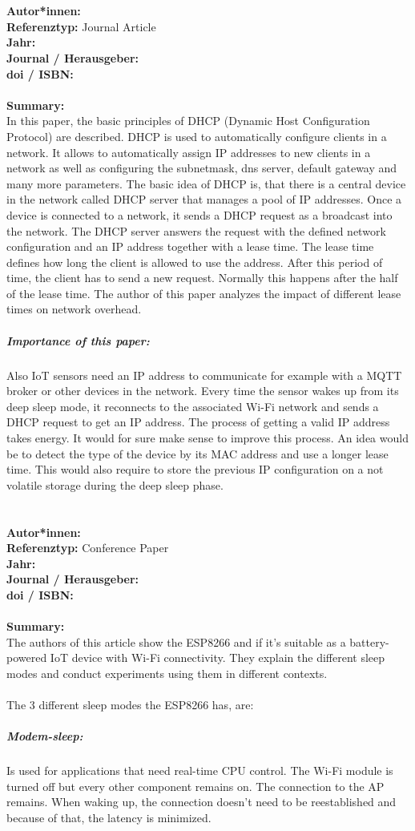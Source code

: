 \documentclass{report}
\newcommand{\createConferencePaperHeader}[1]{
    {\let\clearpage\relax \chapter{\citetitle{#1}}}
    \noindent
    \textbf{Autor*innen:} \citeauthor{#1} \\
    \textbf{Referenztyp:} Conference Paper\\
    \textbf{Jahr:} \citeyear{#1} \\
    \textbf{Journal / Herausgeber:} \citelist{#1}{publisher}\\
    \textbf{doi / ISBN:} \citefield{#1}{doi} \\\\
    \textbf{Summary:}\\
}
\newcommand{\createJournalArticleHeader}[1]{
    {\let\clearpage\relax \chapter{\citetitle{#1}}}
    \noindent
    \textbf{Autor*innen:} \citeauthor{#1} \\
    \textbf{Referenztyp:} Journal Article\\
    \textbf{Jahr:} \citeyear{#1} \\
    \textbf{Journal / Herausgeber:} \citefield{#1}{journaltitle}\\
    \textbf{doi / ISBN:} \citefield{#1}{doi} \\\\
    \textbf{Summary:}\\
}
\begin{document}

\createJournalArticleHeader{li_how_2018}
In this paper, the basic principles of DHCP (Dynamic Host Configuration Protocol) are described. 
DHCP is used to automatically configure clients in a network. 
It allows to automatically assign IP addresses to new clients in a network as well as configuring the subnetmask, dns server, default gateway and many more parameters.
The basic idea of DHCP is, that there is a central device in the network called DHCP server that manages a pool of IP addresses.
Once a device is connected to a network, it sends a DHCP request as a broadcast into the network. 
The DHCP server answers the request with the defined network configuration and an IP address together with a lease time.
The lease time defines how long the client is allowed to use the address. After this period of time, the client has to send a new request. 
Normally this happens after the half of the lease time.
The author of this paper analyzes the impact of different lease times on network overhead.
\\
\paragraph{Importance of this paper:}
Also IoT sensors need an IP address to communicate for example with a MQTT broker or other devices in the network.
Every time the sensor wakes up from its deep sleep mode, it reconnects to the associated Wi-Fi network and sends a DHCP request to get an IP address.
The process of getting a valid IP address takes energy. It would for sure make sense to improve this process. 
An idea would be to detect the type of the device by its MAC address and use a longer lease time. This would also require to store the previous IP configuration on a not volatile storage during the deep sleep phase.


\createConferencePaperHeader{mesquita_assessing_2018}
The authors of this article show the ESP8266 and if it's suitable as a battery-powered IoT device with Wi-Fi connectivity.
They explain the different sleep modes and conduct experiments using them in different contexts.\\\\
The 3 different sleep modes the ESP8266 has, are:\\
\paragraph{Modem-sleep:} Is used for applications that need real-time CPU control. The Wi-Fi module is turned off but every other component remains on. The connection to the AP remains. When waking up, the connection doesn't need to be reestablished and because of that, the latency is minimized.
\end{document}
